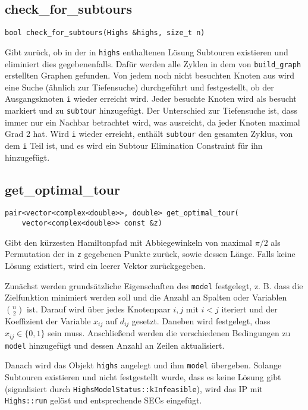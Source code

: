 \documentclass[a4paper, 10pt, ngerman]{article}
\begin{document}
\subsection{check\_for\_subtours}
\verb|bool check_for_subtours(Highs &highs, size_t n)|
\medskip

\noindent Gibt zurück, ob in der in \verb|highs| enthaltenen Lösung Subtouren existieren und eliminiert dies gegebenenfalls. Dafür werden alle Zyklen in dem von \verb|build_graph| erstellten Graphen gefunden. Von jedem noch nicht besuchten Knoten aus wird eine Suche (ähnlich zur Tiefensuche) durchgeführt und festgestellt, ob der Ausgangsknoten \verb|i| wieder erreicht wird. Jeder besuchte Knoten wird als besucht markiert und zu \verb|subtour| hinzugefügt. Der Unterschied zur Tiefensuche ist, dass immer nur ein Nachbar betrachtet wird, was ausreicht, da jeder Knoten maximal Grad 2 hat. Wird \verb|i| wieder erreicht, enthält \verb|subtour| den gesamten Zyklus, von dem \verb|i| Teil ist, und es wird ein Subtour Elimination Constraint für ihn hinzugefügt.

\subsection{get\_optimal\_tour}

\verb|pair<vector<complex<double>>, double> get_optimal_tour(| \\
\verb|    vector<complex<double>> const &z)|
\medskip

\noindent Gibt den kürzesten Hamiltonpfad mit Abbiegewinkeln von maximal $\pi / 2$ als Permutation der in \verb|z| gegebenen Punkte zurück, sowie dessen Länge. Falls keine Lösung existiert, wird ein leerer Vektor zurückgegeben.

Zunächst werden grundsätzliche Eigenschaften des \verb|model| festgelegt, z. B. dass die Zielfunktion minimiert werden soll und die Anzahl an Spalten oder Variablen $\binom n 2$ ist. Darauf wird über jedes Knotenpaar $i, j$ mit $i < j$ iteriert und der Koeffizient der Variable $x_{ij}$ auf $d_{ij}$ gesetzt. Daneben wird festgelegt, dass $x_{ij} \in \{0, 1\}$ sein muss. Anschließend werden die verschiedenen Bedingungen zu \verb|model| hinzugefügt und dessen Anzahl an Zeilen aktualisiert.

Danach wird das Objekt \verb|highs| angelegt und ihm \verb|model| übergeben. Solange Subtouren existieren und nicht festgestellt wurde, dass es keine Lösung gibt (signalisiert durch \verb|HighsModelStatus::kInfeasible|), wird das IP mit \verb|Highs::run| gelöst und entsprechende SECs eingefügt.
\end{document}
